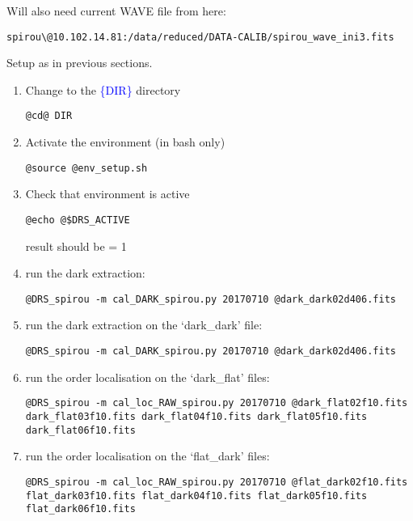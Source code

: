 Will also need current WAVE file from here:
\begin{lstlisting}[style=bashstyle]
spirou\@10.102.14.81:/data/reduced/DATA-CALIB/spirou_wave_ini3.fits
\end{lstlisting}  


\noindent Setup as in previous sections.

\begin{enumerate}

\item Change to the \textcolor{blue}{\{DIR\}} directory
\begin{lstlisting}[style=bashstyle]
@cd@ DIR
\end{lstlisting}  

\item Activate the environment (in bash only)
\begin{lstlisting}[style=bashstyle]
@source @env_setup.sh
\end{lstlisting}  

\item Check that environment is active
\begin{lstlisting}[style=bashstyle]
@echo @$DRS_ACTIVE
\end{lstlisting}  

\noindent result should be = 1

\item run the dark extraction:
\begin{lstlisting}[style=bashstyle]
@DRS_spirou -m cal_DARK_spirou.py 20170710 @dark_dark02d406.fits
\end{lstlisting}  


\item run the dark extraction on the `dark\_dark' file:
\begin{lstlisting}[style=bashstyle]
@DRS_spirou -m cal_DARK_spirou.py 20170710 @dark_dark02d406.fits
\end{lstlisting}  

\item run the order localisation on the `dark\_flat' files:
\begin{lstlisting}[style=bashstyle]
@DRS_spirou -m cal_loc_RAW_spirou.py 20170710 @dark_flat02f10.fits dark_flat03f10.fits dark_flat04f10.fits dark_flat05f10.fits dark_flat06f10.fits
\end{lstlisting}  

\item run the order localisation on the `flat\_dark' files:
\begin{lstlisting}[style=bashstyle]
@DRS_spirou -m cal_loc_RAW_spirou.py 20170710 @flat_dark02f10.fits flat_dark03f10.fits flat_dark04f10.fits flat_dark05f10.fits flat_dark06f10.fits
\end{lstlisting}  


\end{enumerate}

